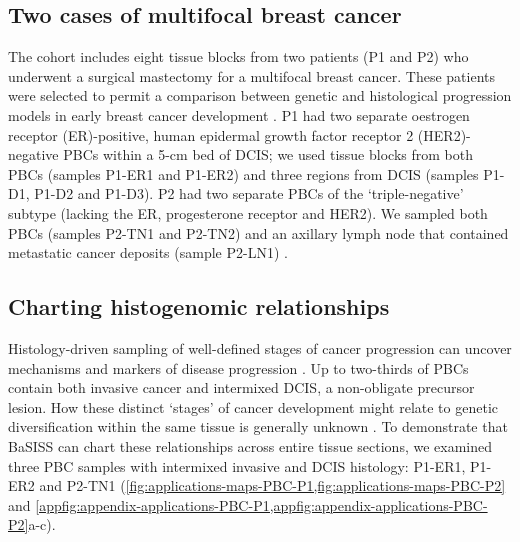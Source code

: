 \subsection{Two cases of multifocal breast cancer}
\label{sec:applications-cohort-introduction}
The cohort includes eight tissue blocks from two patients (P1 and P2) who underwent a surgical mastectomy for a multifocal breast cancer. These patients were selected to permit a comparison between genetic and histological progression models in early breast cancer development \parencite{Cowell2013-du} . P1 had two separate oestrogen receptor (ER)-positive, human epidermal growth factor receptor 2 (HER2)-negative \acfp{PBC} within a 5-cm bed of \ac{DCIS}; we used tissue blocks from both \acp{PBC} (samples P1-ER1 and P1-ER2) and three regions from \ac{DCIS} (samples P1-D1, P1-D2 and P1-D3). P2 had two separate PBCs of the `triple-negative' subtype (lacking the ER, progesterone receptor and HER2). We sampled both PBCs (samples P2-TN1 and P2-TN2) and an axillary lymph node that contained metastatic cancer deposits (sample P2-LN1) .


\subsection{Charting histogenomic relationships}

Histology-driven sampling of well-defined stages of cancer progression can uncover mechanisms and markers of disease progression \parencite{Risom2022-uw,Casasent2018-gx,Cowell2013-du,Nirmal2022-sq}. Up to two-thirds of \acp{PBC} contain both invasive cancer and intermixed \ac{DCIS}, a non-obligate precursor lesion. How these distinct `stages' of cancer development might relate to genetic diversification within the same tissue is generally unknown \parencite{Kole2019-hl} . To demonstrate that \ac{BaSISS} can chart these relationships across entire tissue sections, we examined three PBC samples with intermixed invasive and \ac{DCIS} histology: P1-ER1, P1-ER2 and P2-TN1 (\cref{fig:applications-maps-PBC-P1,fig:applications-maps-PBC-P2} and \cref{appfig:appendix-applications-PBC-P1,appfig:appendix-applications-PBC-P2}a-c).

